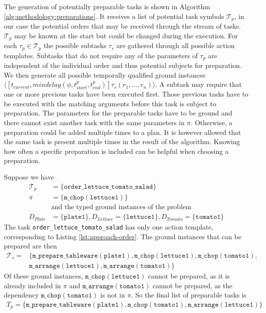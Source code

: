 The generation of potentially preparable tasks is shown in Algorithm \ref{alg:methodology:preparations}.
It receives a list of potential task symbols $\mathcal{T}_p$, in our case the potential orders that may be received through the stream of tasks.
$\mathcal{T}_p$ may be known at the start but could be changed during the execution.
For each $\tau_p \in \mathcal{T}_p$ the possible subtasks $\tau_s$ are gathered through all possible action templates.
Subtasks that do not require any of the parameters of $\tau_p$ are independent of the individual order and thus potential subjects for preparation.
We then generate all possible temporally qualified ground instances $\langle[t_{current}, mindelay(\phi,t^p_{start}, t^p_{end})] \tau_s(r_1,\dots,r_n) \rangle$.
A subtask may require that one or more previous tasks have been executed first.
Those previous tasks have to be executed with the matching arguments before this task is subject to preparation.
The parameters for the preparable tasks have to be ground and there cannot exist another task with the same parameters in $\pi$.
Otherwise, a preparation could be added multiple times to a plan.
It is however allowed that the same task is present multiple times in the result of the algorithm.
Knowing how often a specific preparation is included can be helpful when choosing a preparation.


\begin{example}
  Suppose we have 
  \begin{align*}
    \mathcal{T}_p &= \{\mathtt{order\_lettuce\_tomato\_salad}\} \\
    \pi&=\{\mathtt{m\_chop(lettuce1)}\} \\
    &\text{and the typed ground instances of the problem} \\
    D_{Plate}&=\{\mathtt{plate1}\}, D_{Lettuce}=\{\mathtt{lettuce1}\}, D_{Tomato}=\{\mathtt{tomato1}\}
  \end{align*}
  The task \verb|order_lettuce_tomato_salad| has only one action template, corresponding to Listing \ref{lst:approach-order}.
  The ground instances that can be prepared are then 
  \begin{align*}
    \mathcal{T}_s=&\{\mathtt{m\_prepare\_tableware(plate1)}, \mathtt{m\_chop(lettuce1)}, \mathtt{m\_chop(tomato1)},\\ 
    &\mathtt{m\_arrange(lettuce1)}, \mathtt{m\_arrange(tomato1)}\}
  \end{align*}
  Of these ground instances, $\mathtt{m\_chop(lettuce1)}$ cannot be prepared, as it is already included in $\pi$ and $\mathtt{m\_arrange(tomato1)}$ cannot be prepared, as the dependency $\mathtt{m\_chop(tomato1)}$ is not in $\pi$.
  So the final list of preparable tasks is 
  \begin{align*}
    T_p=\{\mathtt{m\_prepare\_tableware(plate1)}, \mathtt{m\_chop(tomato1)}, \mathtt{m\_arrange(lettuce1)}\}
  \end{align*}
\end{example}

